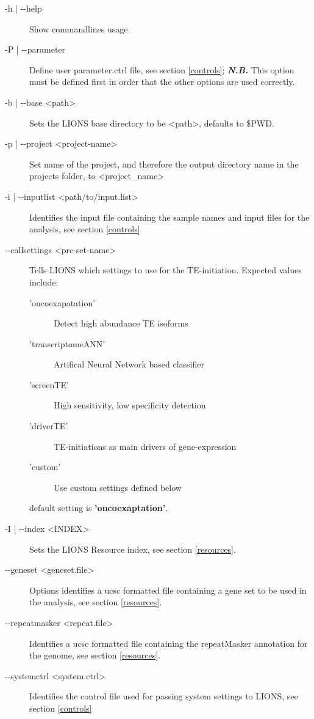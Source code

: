 \documentclass[11pt]{scrartcl}
\newcommand{\arrows}[1]{\textless #1\textgreater}
\begin{document}
\begin{description}
\item[-h | -{}-help] Show commandlines usage
\item[-P | -{}-parameter] Define user parameter.ctrl file, see section \ref{controls}; \textit{\textbf{N.B.}} This option must be defined first in order that the other options are used correctly. 
\item[-b | -{}-base <path>] Sets the LIONS base directory to be <path>, defaults to \$PWD.
\item[-p | -{}-project <project-name>] Set name of the project, and therefore the output directory name in the projects folder, to <project\_name>
\item[-i | -{}-inputlist <path/to/input.list>] Identifies the input file containing the sample names and input files for the analysis, see section \ref{controls}
\item[-{}-callsettings \arrows{pre-set-name}] Tells LIONS which settings to use for the TE-initiation. Expected values include: 
        \begin{description}
        \item['oncoexapatation'] Detect high abundance TE isoforms
        \item['transcriptomeANN'] Artifical Neural Network based classifier
        \item['screenTE'] High sensitivity, low specificity detection
        \item['driverTE'] TE-initiations as main drivers of gene-expression
        \item['custom'] Use custom settings defined below
        \end{description}
	default setting is \textbf{'oncoexaptation'}.

\item[-I | -{}-index <INDEX>] Sets the LIONS Resource index, see section \ref{resources}.
\item[-{}-geneset <geneset.file>] Options identifies a ucsc formatted file containing a gene set to be
  used in the analysis, see section \ref{resources}.
\item[-{}-repeatmasker <repeat.file>] Identifies a ucsc formatted file containing the repeatMasker
  annotation for the genome, see section \ref{resources}.

\item[-{}-systemctrl <system.ctrl>] Identifies the control file used for passing system settings to LIONS, see section \ref{controls} 
 

\end{description}
\end{document}
